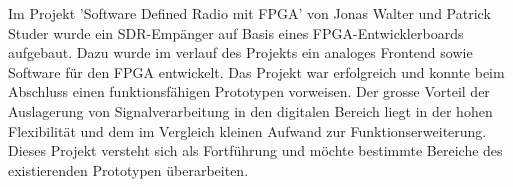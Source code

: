 Im Projekt 'Software Defined Radio mit FPGA' von Jonas Walter und Patrick Studer wurde ein SDR-Empänger auf Basis eines FPGA-Entwicklerboards aufgebaut. Dazu wurde im verlauf des Projekts ein analoges Frontend sowie Software für den FPGA entwickelt. Das Projekt war erfolgreich und konnte beim Abschluss einen funktionsfähigen Prototypen vorweisen.
Der grosse Vorteil der Auslagerung von Signalverarbeitung in den digitalen Bereich liegt in der hohen Flexibilität und dem im Vergleich kleinen Aufwand zur Funktionserweiterung.
Dieses Projekt versteht sich als Fortführung und möchte bestimmte Bereiche des existierenden Prototypen überarbeiten.